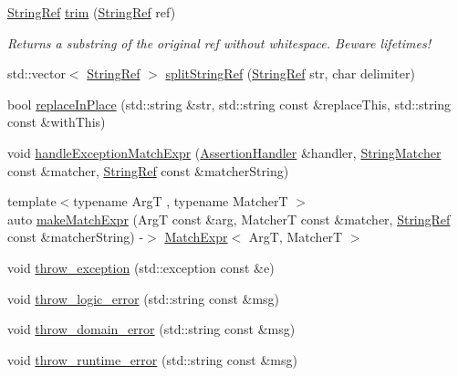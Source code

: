 \begin{DoxyCompactItemize}
\mbox{\hyperlink{class_catch_1_1_string_ref}{String\+Ref}} \mbox{\hyperlink{namespace_catch_a6f6d8ef0349688290bd242b50a702c28}{trim}} (\mbox{\hyperlink{class_catch_1_1_string_ref}{String\+Ref}} ref)
\begin{DoxyCompactList}\small\item\em Returns a substring of the original ref without whitespace. Beware lifetimes! \end{DoxyCompactList}\item 
std\+::vector$<$ \mbox{\hyperlink{class_catch_1_1_string_ref}{String\+Ref}} $>$ \mbox{\hyperlink{namespace_catch_a35ef4c6329ab86a47243c25a58274109}{split\+String\+Ref}} (\mbox{\hyperlink{class_catch_1_1_string_ref}{String\+Ref}} str, char delimiter)
\item 
bool \mbox{\hyperlink{namespace_catch_afe4e6770da547e43e9e4eeaa05f946ea}{replace\+In\+Place}} (std\+::string \&str, std\+::string const \&replace\+This, std\+::string const \&with\+This)
\item 
void \mbox{\hyperlink{namespace_catch_a3a96a82307107087642e22fc4be5844d}{handle\+Exception\+Match\+Expr}} (\mbox{\hyperlink{class_catch_1_1_assertion_handler}{Assertion\+Handler}} \&handler, \mbox{\hyperlink{namespace_catch_aba438977e831821a2eeca82b9b4f4af2}{String\+Matcher}} const \&matcher, \mbox{\hyperlink{class_catch_1_1_string_ref}{String\+Ref}} const \&matcher\+String)
\item 
{\footnotesize template$<$typename ArgT , typename MatcherT $>$ }\\auto \mbox{\hyperlink{namespace_catch_a23a9a9a6dfef7ecd5e0eaf553fc52de6}{make\+Match\+Expr}} (ArgT const \&arg, MatcherT const \&matcher, \mbox{\hyperlink{class_catch_1_1_string_ref}{String\+Ref}} const \&matcher\+String) -\/$>$ \mbox{\hyperlink{class_catch_1_1_match_expr}{Match\+Expr}}$<$ ArgT, MatcherT $>$
\item 
void \mbox{\hyperlink{namespace_catch_a3cbceeab9252d1b752f66a2826e92548}{throw\+\_\+exception}} (std\+::exception const \&e)
\item 
void \mbox{\hyperlink{namespace_catch_a707884e681203fef6bf7dbf752532fa5}{throw\+\_\+logic\+\_\+error}} (std\+::string const \&msg)
\item 
void \mbox{\hyperlink{namespace_catch_ae67297c3e265b0fcd55de371bf408e4e}{throw\+\_\+domain\+\_\+error}} (std\+::string const \&msg)
\item 
void \mbox{\hyperlink{namespace_catch_a48d2c35022dd9d56a1b7ee78ad581eea}{throw\+\_\+runtime\+\_\+error}} (std\+::string const \&msg)
\item 

\end{DoxyCompactItemize}
